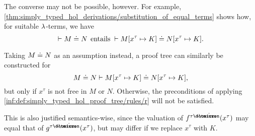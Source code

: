 \begin{remark}
  The converse may not be possible, however. For example, \cref{thm:simply_typed_hol_derivations/substitution_of_equal_terms} shows how, for suitable \( {\mathrm \lambda} \)-terms, we have
  \begin{equation*}
    \vdash M \syneq N \thinspace \T{entails} {}\vdash M[x^\tau \mapsto K] \syneq N[x^\tau \mapsto K].
  \end{equation*}

  Taking \( M \doteq N \) as an assumption instead, a proof tree can similarly be constructed for
  \begin{equation*}
    M \doteq N \vdash M[x^\tau \mapsto K] \doteq N[x^\tau \mapsto K],
  \end{equation*}
  but only if \( x^\tau \) is not free in \( M \) or \( N \). Otherwise, the preconditions of applying \ref{inf:def:simply_typed_hol_proof_tree/rules/r} will not be satisfied.

  This is also justified semantics-wise, since the valuation of \( f^{\tau \synimplies \syn\omicron}(x^\tau) \) may equal that of \( g^{\tau \synimplies \syn\omicron}(x^\tau) \), but may differ if we replace \( x^\tau \) with \( K \).
\end{remark}

